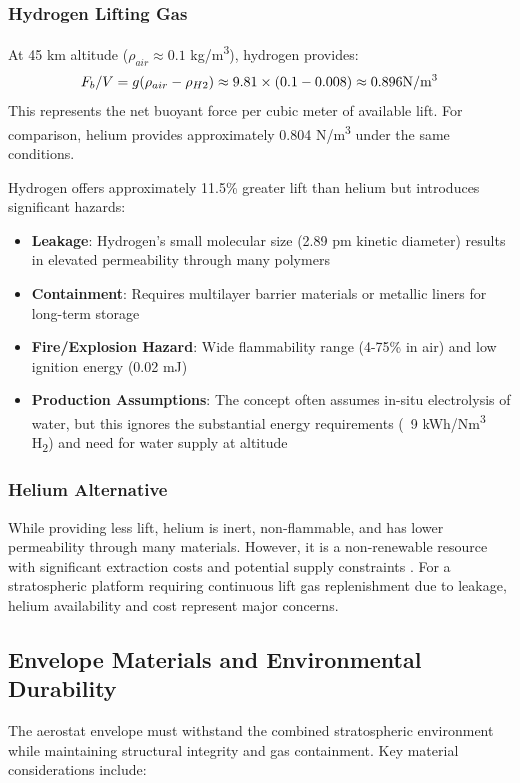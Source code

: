 \documentclass[12pt]{article}
\begin{document}
\subsubsection{Hydrogen Lifting Gas}
At 45 km altitude ($\rho_{air} \approx 0.1$ kg/m\textsuperscript{3}), hydrogen provides:
\begin{equation}
F_b/V = g(\rho_{air} - \rho_{H2}) \approx 9.81 \times (0.1 - 0.008) \approx 0.896  \text{N/m}\textsuperscript{3}
\end{equation}
This represents the net buoyant force per cubic meter of available lift. For comparison, helium provides approximately 0.804 N/m\textsuperscript{3} under the same conditions.

Hydrogen offers approximately 11.5\% greater lift than helium but introduces significant hazards:
\begin{itemize}
    \item \textbf{Leakage}: Hydrogen's small molecular size (2.89 pm kinetic diameter) results in elevated permeability through many polymers \cite{sakurai2010}
    \item \textbf{Containment}: Requires multilayer barrier materials or metallic liners for long-term storage
    \item \textbf{Fire/Explosion Hazard}: Wide flammability range (4-75\% in air) and low ignition energy (0.02 mJ) \cite{zalkind2015}
    \item \textbf{Production Assumptions}: The concept often assumes in-situ electrolysis of water, but this ignores the substantial energy requirements (~9 kWh/Nm\textsuperscript{3} H\textsubscript{2}) and need for water supply at altitude
\end{itemize}

\subsubsection{Helium Alternative}
While providing less lift, helium is inert, non-flammable, and has lower permeability through many materials. However, it is a non-renewable resource with significant extraction costs and potential supply constraints \cite{schwartz2012}. For a stratospheric platform requiring continuous lift gas replenishment due to leakage, helium availability and cost represent major concerns.

\subsection{Envelope Materials and Environmental Durability}
The aerostat envelope must withstand the combined stratospheric environment while maintaining structural integrity and gas containment. Key material considerations include:
\end{document}
